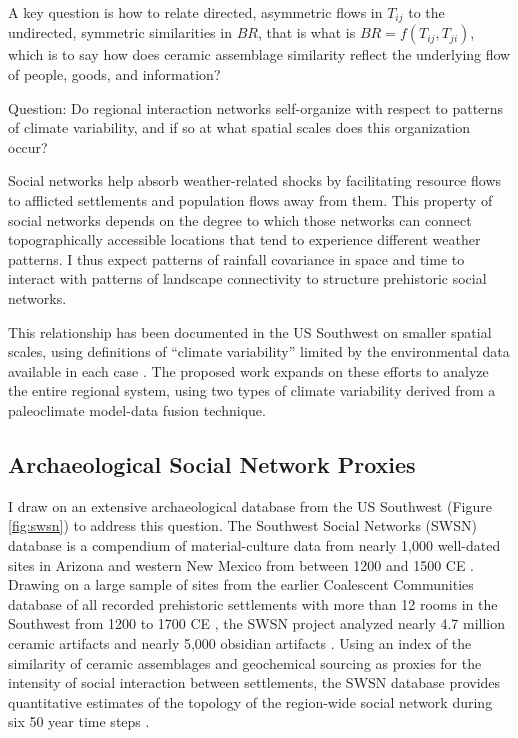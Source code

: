 \documentclass[fleqn,10pt]{wlscirep}
\begin{document}
A key question is how to relate directed, asymmetric flows in $T_{ij}$ to the undirected, symmetric similarities in $BR$, that is what is $BR = f(T_{ij},T_{ji})$, which is to say how does ceramic assemblage similarity reflect the underlying flow of people, goods, and information?


Question: Do regional interaction networks self-organize with respect to patterns of climate variability, and if so at what spatial scales does this organization occur?

Social networks help absorb weather-related shocks by facilitating resource flows to afflicted settlements and population flows away from them. This property of social networks depends on the degree to which those networks can connect topographically accessible locations that tend to experience different weather patterns. I thus expect patterns of rainfall covariance in space and time to interact with patterns of landscape connectivity to structure prehistoric social networks.

This relationship has been documented in the US Southwest on smaller spatial scales, using definitions of ``climate variability'' limited by the environmental data available in each case \cite{Rautman1993a,Cordell2007MesaMigration,Strawhacker2017RiskProvince}. The proposed work expands on these efforts to analyze the entire regional system, using two types of climate variability derived from a paleoclimate model-data fusion technique.

\subsection*{Archaeological Social Network Proxies}

I draw on an extensive archaeological database from the US Southwest (Figure \ref{fig:swsn}) to address this question. The Southwest Social Networks (SWSN) database is a compendium of material-culture data from nearly 1,000 well-dated sites in Arizona and western New Mexico from between 1200 and 1500 CE \cite{Mills2012,Mills2013a,Peeples2013,Borck2015,Hill2015,Mills2015a}. Drawing on a large sample of sites from the earlier Coalescent Communities database of all recorded prehistoric settlements with more than 12 rooms in the Southwest from 1200 to 1700 CE \cite{Hill2004}, the SWSN project analyzed nearly 4.7 million ceramic artifacts and nearly 5,000 obsidian artifacts \cite{Mills2015a}. Using an index of the similarity of ceramic assemblages and geochemical sourcing as proxies for the intensity of social interaction between settlements, the SWSN database provides quantitative estimates of the topology of the region-wide social network during six 50 year time steps \cite{Mills2013a}.
\end{document}
